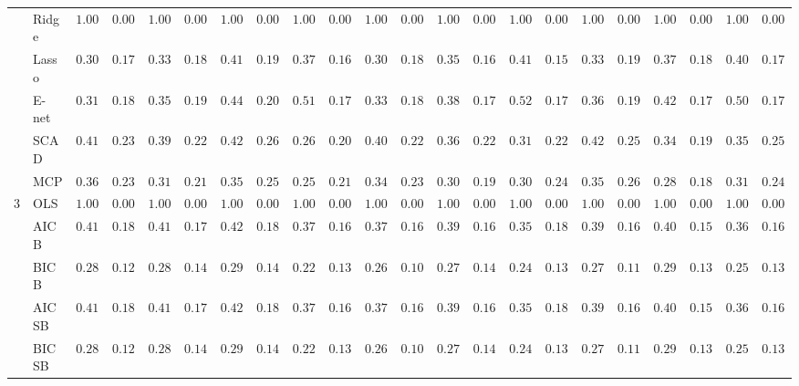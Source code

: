 \begin{tabular}{p{0.2cm}p{1cm}|p{0.6cm}p{0.6cm}|p{0.6cm}p{0.6cm}p{0.6cm}p{0.6cm}p{0.6cm}p{0.6cm}|p{0.6cm}p{0.6cm}p{0.6cm}p{0.6cm}p{0.6cm}p{0.6cm}|p{0.6cm}p{0.6cm}p{0.6cm}p{0.6cm}p{0.6cm}p{0.6cm}}
 & Ridge  & $1.0000$ & $0.0000$ & $1.0000$ & $0.0000$ & $1.0000$ & $0.0000$ & $1.0000$ & $0.0000$ & $1.0000$ & $0.0000$ & $1.0000$ & $0.0000$ & $1.0000$ & $0.0000$ & $1.0000$ & $0.0000$ & $1.0000$ & $0.0000$ & $1.0000$ & $0.0000$ \\
 & Lasso  & $0.3033$ & $0.1779$ & $0.3317$ & $0.1858$ & $0.4100$ & $0.1945$ & $0.3767$ & $0.1652$ & $0.3033$ & $0.1825$ & $0.3583$ & $0.1648$ & $0.4150$ & $0.1580$ & $0.3367$ & $0.1953$ & $0.3733$ & $0.1897$ & $0.4000$ & $0.1708$ \\
 & E-net  & $0.3150$ & $0.1849$ & $0.3550$ & $0.1919$ & $0.4450$ & $0.2025$ & $0.5117$ & $0.1777$ & $0.3333$ & $0.1895$ & $0.3883$ & $0.1725$ & $0.5233$ & $0.1725$ & $0.3600$ & $0.1978$ & $0.4233$ & $0.1795$ & $0.5000$ & $0.1725$ \\
 & SCAD  & $0.4100$ & $0.2362$ & $0.3983$ & $0.2208$ & $0.4267$ & $0.2620$ & $0.2617$ & $0.2014$ & $0.4033$ & $0.2250$ & $0.3667$ & $0.2235$ & $0.3133$ & $0.2226$ & $0.4250$ & $0.2599$ & $0.3483$ & $0.1955$ & $0.3533$ & $0.2532$ \\
 & MCP  & $0.3667$ & $0.2333$ & $0.3133$ & $0.2109$ & $0.3567$ & $0.2563$ & $0.2517$ & $0.2125$ & $0.3400$ & $0.2308$ & $0.3067$ & $0.1964$ & $0.3083$ & $0.2420$ & $0.3567$ & $0.2649$ & $0.2867$ & $0.1881$ & $0.3150$ & $0.2438$ \\\hline
3 & OLS  & $1.0000$ & $0.0000$ & $1.0000$ & $0.0000$ & $1.0000$ & $0.0000$ & $1.0000$ & $0.0000$ & $1.0000$ & $0.0000$ & $1.0000$ & $0.0000$ & $1.0000$ & $0.0000$ & $1.0000$ & $0.0000$ & $1.0000$ & $0.0000$ & $1.0000$ & $0.0000$ \\
 & AIC B  & $0.4150$ & $0.1873$ & $0.4100$ & $0.1748$ & $0.4267$ & $0.1825$ & $0.3750$ & $0.1698$ & $0.3750$ & $0.1665$ & $0.3950$ & $0.1652$ & $0.3517$ & $0.1879$ & $0.3917$ & $0.1681$ & $0.4050$ & $0.1540$ & $0.3650$ & $0.1653$ \\
 & BIC B  & $0.2800$ & $0.1273$ & $0.2833$ & $0.1489$ & $0.2967$ & $0.1433$ & $0.2283$ & $0.1312$ & $0.2600$ & $0.1068$ & $0.2750$ & $0.1429$ & $0.2417$ & $0.1348$ & $0.2767$ & $0.1190$ & $0.2967$ & $0.1331$ & $0.2550$ & $0.1350$ \\
 & AIC SB  & $0.4150$ & $0.1873$ & $0.4100$ & $0.1748$ & $0.4267$ & $0.1825$ & $0.3767$ & $0.1685$ & $0.3750$ & $0.1665$ & $0.3950$ & $0.1652$ & $0.3517$ & $0.1879$ & $0.3917$ & $0.1681$ & $0.4083$ & $0.1542$ & $0.3667$ & $0.1658$ \\
 & BIC SB  & $0.2800$ & $0.1273$ & $0.2833$ & $0.1489$ & $0.2967$ & $0.1433$ & $0.2283$ & $0.1312$ & $0.2617$ & $0.1039$ & $0.2750$ & $0.1429$ & $0.2400$ & $0.1347$ & $0.2783$ & $0.1162$ & $0.2967$ & $0.1331$ & $0.2550$ & $0.1350$ \\

\end{tabular}
